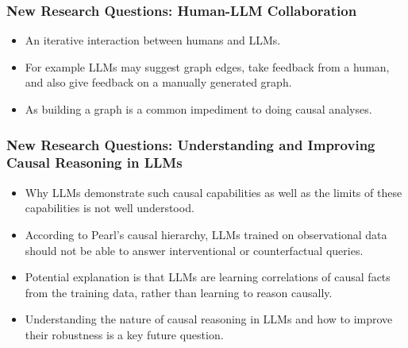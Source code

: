 \documentclass{beamer}
\begin{document}
\begin{frame}
	\frametitle{New Research Questions: Human-LLM Collaboration}
	\begin{itemize}
		\item An iterative interaction between humans and LLMs.
		\item For example LLMs may suggest graph edges, take feedback from
			a human, and also give feedback on a manually generated
			graph.
		\item As building a graph is a common impediment to
			doing causal analyses.
	\end{itemize}
\end{frame}

\begin{frame}
	\frametitle{New Research Questions: Understanding and Improving Causal Reasoning in LLMs}
	\begin{itemize}
		\item Why LLMs demonstrate such causal capabilities as well as
			the limits of these capabilities is not well
			understood.
		\item According to Pearl's causal hierarchy, LLMs trained on
			observational data should not be able to answer
			interventional or counterfactual queries.
		\item Potential explanation is that LLMs are learning correlations
			of causal facts from the training data, rather than learning
			to reason causally.
		\item Understanding the nature of causal reasoning in LLMs and how to
			improve their robustness is a key future question.
	\end{itemize}
\end{frame}
\end{document}

